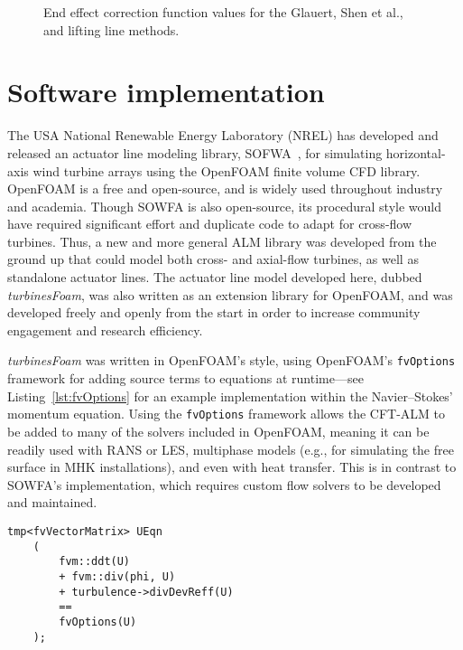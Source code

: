 \begin{figure}
    \centering
    
    \caption{End effect correction function values for the Glauert, Shen et al.,
        and lifting line methods.}
    
    \label{fig:end-effects}
\end{figure}


\section{Software implementation}

The USA National Renewable Energy Laboratory (NREL) has developed and released
an actuator line modeling library, SOFWA~\cite{Churchfield2014b}, for simulating
horizontal-axis wind turbine arrays using the OpenFOAM finite volume CFD
library. OpenFOAM is a free and open-source, and is widely used throughout
industry and academia. Though SOWFA is also open-source, its procedural style
would have required significant effort and duplicate code to adapt for
cross-flow turbines. Thus, a new and more general ALM library was developed from
the ground up that could model both cross- and axial-flow turbines, as well as
standalone actuator lines. The actuator line model developed here, dubbed
\textit{turbinesFoam}, was also written as an extension library for OpenFOAM,
and was developed freely and openly from the start in order to increase
community engagement and research efficiency.

\textit{turbinesFoam} was written in OpenFOAM's style, using OpenFOAM's
\texttt{fvOptions} framework for adding source terms to equations at
runtime---see Listing~\ref{lst:fvOptions} for an example implementation within
the Navier--Stokes' momentum equation. Using the \texttt{fvOptions} framework
allows the CFT-ALM to be added to many of the solvers included in OpenFOAM,
meaning it can be readily used with RANS or LES, multiphase models (e.g., for
simulating the free surface in MHK installations), and even with heat transfer.
This is in contrast to SOWFA's implementation, which requires custom flow
solvers to be developed and maintained.

\begin{lstlisting}[float,caption=Adding source terms to the momentum equation in OpenFOAM.,label=lst:fvOptions]
    tmp<fvVectorMatrix> UEqn
    (
        fvm::ddt(U)
        + fvm::div(phi, U)
        + turbulence->divDevReff(U)
        ==
        fvOptions(U)
    );
\end{lstlisting}


